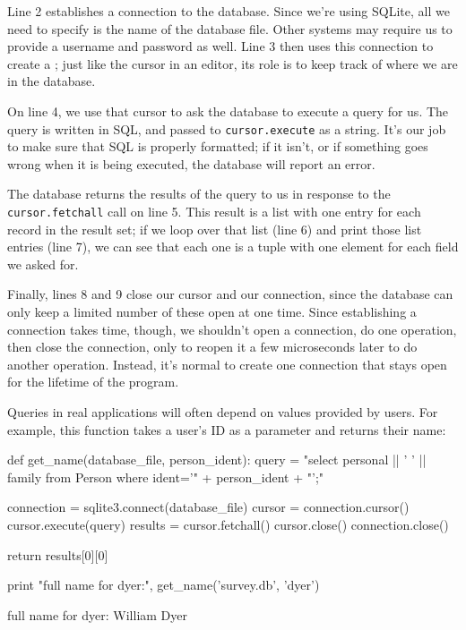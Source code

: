 \documentclass{book}
\begin{document}
Line 2 establishes a connection to the database. Since we're using
SQLite, all we need to specify is the name of the database file. Other
systems may require us to provide a username and password as well. Line
3 then uses this connection to create a ;
just like the cursor in an editor, its role is to keep track of where we
are in the database.

On line 4, we use that cursor to ask the database to execute a query for
us. The query is written in SQL, and passed to \texttt{cursor.execute}
as a string. It's our job to make sure that SQL is properly formatted;
if it isn't, or if something goes wrong when it is being executed, the
database will report an error.

The database returns the results of the query to us in response to the
\texttt{cursor.fetchall} call on line 5. This result is a list with one
entry for each record in the result set; if we loop over that list (line
6) and print those list entries (line 7), we can see that each one is a
tuple with one element for each field we asked for.

Finally, lines 8 and 9 close our cursor and our connection, since the
database can only keep a limited number of these open at one time. Since
establishing a connection takes time, though, we shouldn't open a
connection, do one operation, then close the connection, only to reopen
it a few microseconds later to do another operation. Instead, it's
normal to create one connection that stays open for the lifetime of the
program.

Queries in real applications will often depend on values provided by
users. For example, this function takes a user's ID as a parameter and
returns their name:

\begin{VerbIn}
def get_name(database_file, person_ident):
    query = "select personal || ' ' || family from Person where ident='" + person_ident + "';"

    connection = sqlite3.connect(database_file)
    cursor = connection.cursor()
    cursor.execute(query)
    results = cursor.fetchall()
    cursor.close()
    connection.close()

    return results[0][0]

print "full name for dyer:", get_name('survey.db', 'dyer')
\end{VerbIn}

\begin{VerbOut}
full name for dyer: William Dyer
\end{VerbOut}
\end{document}

